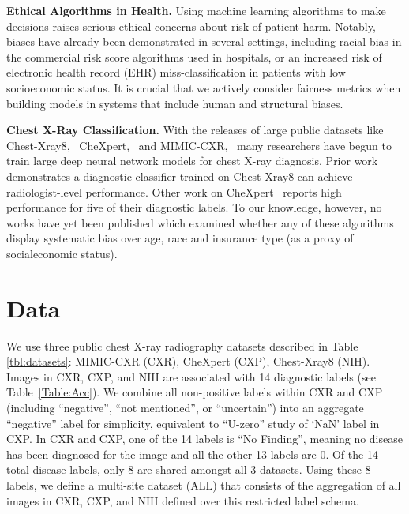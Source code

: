 \documentclass{ws-procs11x85}
\begin{document}
\textbf{Ethical Algorithms in Health.} Using machine learning algorithms to make decisions raises serious ethical concerns about risk of patient harm.\cite{NEJMp1714229} Notably, biases have already been demonstrated in several settings, including racial bias in the commercial risk score algorithms used in hospitals,\cite{racehealth19} or an increased risk of electronic health record (EHR) miss-classification in patients with low socioeconomic status.\cite{biasEHR} It is crucial that we actively consider fairness metrics when building models in systems that include human and structural biases.



\textbf{Chest X-Ray Classification.}
With the releases of large public datasets like Chest-Xray8,~\cite{wang_chestx-ray8:_2017} CheXpert,~\cite{irvin_chexpert:_2019} and MIMIC-CXR,~\cite{johnson_mimic-cxr:_2019} many researchers have begun to train large deep neural network models for chest X-ray diagnosis. \cite{rajpurkar_deep_2018,yao_learning_2017,irvin_chexpert:_2019, akbarian2020evaluating} Prior work\cite{rajpurkar_deep_2018} demonstrates a diagnostic classifier trained on Chest-Xray8 can achieve radiologist-level performance. Other work on CheXpert~\cite{irvin_chexpert:_2019} reports high performance for five of their diagnostic labels. To our knowledge, however, no works have yet been published which  examined whether any of these algorithms display systematic bias over age, race and insurance type (as a proxy of socialeconomic status).



\section{Data} 
\label{sec:Dataset}
We use three public chest X-ray radiography datasets described in Table \ref{tbl:datasets}: MIMIC-CXR (CXR),\cite{johnson_mimic-cxr:_2019} CheXpert (CXP),\cite{irvin_chexpert:_2019}  Chest-Xray8 (NIH).\cite{wang_chestx-ray8:_2017} Images in CXR, CXP, and NIH are associated with 14 diagnostic labels (see Table~\ref{Table:Acc}). We combine all non-positive labels within CXR and CXP (including ``negative'', ``not mentioned'', or ``uncertain'') into an aggregate ``negative'' label for simplicity, equivalent to ``U-zero'' study of `NaN' label in CXP. In CXR and CXP, one of the 14 labels is ``No Finding'', meaning no disease has been diagnosed for the image and all the other 13 labels are 0. Of the 14 total disease labels, only 8 are shared amongst all 3 datasets. Using these 8 labels, we define a multi-site dataset (ALL) that consists of the aggregation of all images in CXR, CXP, and NIH defined over this restricted label schema.
\end{document}
